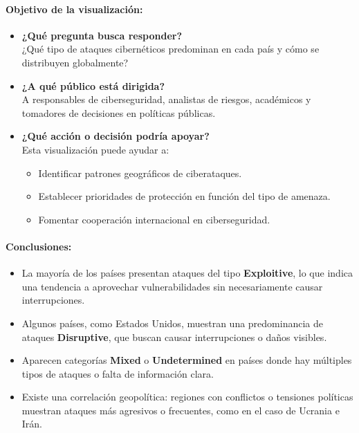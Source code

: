 \documentclass[12pt, a4paper]{article}
\begin{document}
\paragraph{Objetivo de la visualización:}

\begin{itemize}
    \item \textbf{¿Qué pregunta busca responder?} \\
    ¿Qué tipo de ataques cibernéticos predominan en cada país y cómo se distribuyen globalmente?

    \item \textbf{¿A qué público está dirigida?} \\
    A responsables de ciberseguridad, analistas de riesgos, académicos y tomadores de decisiones en políticas públicas.

    \item \textbf{¿Qué acción o decisión podría apoyar?} \\
    Esta visualización puede ayudar a:
    \begin{itemize}
        \item Identificar patrones geográficos de ciberataques.
        \item Establecer prioridades de protección en función del tipo de amenaza.
        \item Fomentar cooperación internacional en ciberseguridad.
    \end{itemize}
\end{itemize}

\paragraph{Conclusiones:}
\begin{itemize}
    \item La mayoría de los países presentan ataques del tipo \textbf{Exploitive}, lo que indica una tendencia a aprovechar vulnerabilidades sin necesariamente causar interrupciones.
    \item Algunos países, como Estados Unidos, muestran una predominancia de ataques \textbf{Disruptive}, que buscan causar interrupciones o daños visibles.
    \item Aparecen categorías \textbf{Mixed} o \textbf{Undetermined} en países donde hay múltiples tipos de ataques o falta de información clara.
    \item Existe una correlación geopolítica: regiones con conflictos o tensiones políticas muestran ataques más agresivos o frecuentes, como en el caso de Ucrania e Irán.
\end{itemize}
\end{document}
